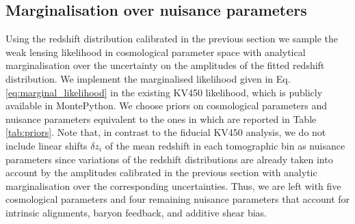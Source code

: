 \documentclass{aa}
\begin{document}
\subsection{Marginalisation over nuisance parameters} 
Using the redshift distribution calibrated in the previous section we sample the weak lensing likelihood in cosmological parameter space with analytical marginalisation over the uncertainty on the amplitudes of the fitted redshift distribution. We implement the marginalised likelihood given in Eq. \ref{eq:marginal_likelihood} in the existing KV450 likelihood, which is publicly available in {\sc MontePython}. We choose priors on cosmological parameters and nuisance parameters equivalent to the ones in \cite{hildebrandt18} which are reported in Table \ref{tab:priors}. Note that, in contrast to the fiducial KV450 analysis, we do not include linear shifts $\delta z_i$ of the mean redshift in each tomographic bin as nuisance parameters since variations of the redshift distributions are already taken into account by the amplitudes calibrated in the previous section with analytic marginalisation over the corresponding uncertainties. Thus, we are left with five cosmological parameters and four remaining nuisance parameters that account for intrinsic alignments, baryon feedback, and additive shear bias.
\end{document}

